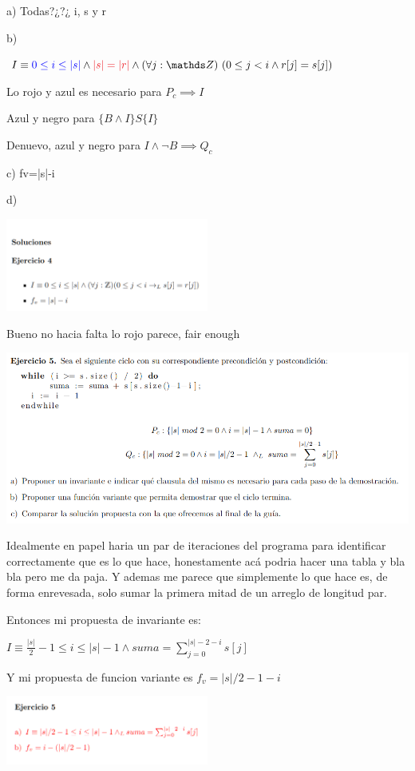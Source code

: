 \documentclass[a4paper,10pt]{article}
\begin{document}
    a) Todas?¿?¿ i, s y r

    b)

$I\equiv{\color{blue} 0\leq i \leq |s|}\land {\color{Red}|s|=|r|} \land \paraTodo[unalinea]{j}{\ent}{0\leq j < i \land r[j]=s[j]}$

    Lo rojo y azul es necesario para $P_c\implies I$

    Azul y negro para $\{B\land I\}S\{I\}$

    Denuevo, azul y negro para $I\land \lnot B \implies Q_c$

    c) fv=|s|-i

    d)

    \includegraphics*[width=0.5\textwidth]{solE4.png}

    Bueno no hacia falta lo rojo parece, fair enough

    \pagebreak

    \includegraphics*[width=\textwidth]{e5.png}

    Idealmente en papel haria un par de iteraciones del programa para identificar correctamente que es lo que hace, honestamente acá podria hacer una tabla y bla bla pero me da paja. Y ademas me parece que simplemente lo que hace es, de forma enrevesada, solo sumar la primera mitad de un arreglo de longitud par.

    Entonces mi propuesta de invariante es:

$I\equiv \frac{|s|}{2}-1\leq i \leq |s|-1 \land suma=\sum_{j=0}^{|s|-2-i}s[j]$

    Y mi propuesta de funcion variante es
$f_v=|s|/2-1-i$

    \includegraphics*[width=0.5\textwidth]{solE5.png}
\end{document}
